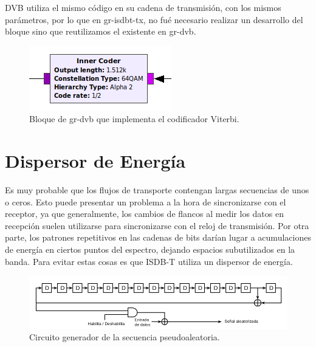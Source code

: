 	DVB utiliza el mismo código en su cadena de transmisión, con los mismos parámetros, por lo que en gr-isdbt-tx, no fué necesario realizar un desarrollo del bloque sino que reutilizamos el existente en gr-dvb. 
	
	\begin{figure}[h!]
		\centering
		\includegraphics[scale=0.5]{figuras/cap05/inner}
		\caption{\label{f:inner} Bloque de gr-dvb que implementa el codificador Viterbi.}
	\end{figure}

\section{Dispersor de Energía}

Es muy probable que los flujos de transporte contengan largas secuencias de unos o ceros. Esto puede presentar un problema a la hora de sincronizarse con el receptor, ya que generalmente, los cambios de flancos al medir los datos en recepción suelen utilizarse para sincronizarse con el reloj de transmisión. Por otra parte, los patrones repetitivos en las cadenas de bits darían lugar a acumulaciones de energía en ciertos puntos del espectro, dejando espacios subutilizados en la banda. Para evitar estas cosas es que ISDB-T utiliza un dispersor de energía.

\begin{figure}[h!]
	\centering
	\includegraphics[scale=0.4]{figuras/cap05/dispersor_energia}
	\caption{\label{f:diagrama_energy} Circuito generador de la secuencia pseudoaleatoria.}
\end{figure}


